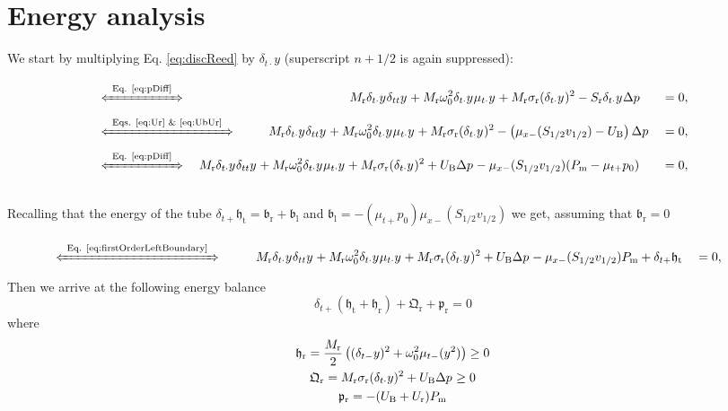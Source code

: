 \section{Energy analysis}
We start by multiplying Eq. \eqref{eq:discReed} by $\delta_{t\cdot}y$ (superscript $n+1/2$ is again suppressed):
\begin{alignat}{2}
    &\xLeftrightarrow{\mystrut\ \text{Eq. \eqref{eq:pDiff}}\ }\qquad\qquad\qquad\qquad\qquad\qquad\quad M_\text{r}\delta_{t\cdot}y^{\nph}\delta_{tt}y^{\nph} + M_\text{r}\omega_0^2\delta_{t\cdot}y^{\nph}\mu_{t\cdot}y^{\nph} + M_\text{r} \sigma_\text{r}(\delta_{t\cdot}y^{\nph})^2 - S_\text{r}\delta_{t\cdot}y^{\nph}\Delta p^{\nph} &&= 0,\nonumber\\[-5pt]
    &\xLeftrightarrow{\mystrut\ \text{Eqs. \eqref{eq:Ur} \& \eqref{eq:UbUr}}\ } \qquad \ \: M_\text{r}\delta_{t\cdot}y^{\nph}\delta_{tt}y^{\nph} + M_\text{r}\omega_0^2\delta_{t\cdot}y^{\nph}\mu_{t\cdot}y^{\nph} + M_\text{r} \sigma_\text{r}(\delta_{t\cdot}y^{\nph})^2 - \left(\mu_{x-}(S_{1/2}v_{1/2})-U_\text{B}\right)\Delta p^{\nph} &&= 0,\nonumber\\[-5pt]
    &\xLeftrightarrow{\mystrut\ \text{Eq. \eqref{eq:pDiff}}\ } \quad M_\text{r}\delta_{t\cdot}y^{\nph}\delta_{tt}y^{\nph} + M_\text{r}\omega_0^2\delta_{t\cdot}y^{\nph}\mu_{t\cdot}y^{\nph} + M_\text{r} \sigma_\text{r}(\delta_{t\cdot}y^{\nph})^2 + U_\text{B}\Delta p^{\nph}-\mu_{x-}(S_{1/2}v_{1/2})(P_\text{m} - \mu_{t+}p_0) &&= 0,\nonumber
\end{alignat}
\vspace{-5pt}\\
Recalling that the energy of the tube $\delta_{t+}\mathfrak{h}_\text{t} = \mathfrak{b}_\text{r} + \mathfrak{b}_\text{l}$ and $\mathfrak{b}_\text{l} = -(\mu_{t+}p_0)\mu_{x-}(S_{1/2}v_{1/2})$ we get, assuming that $\mathfrak{b}_\text{r} = 0$\vspace{-5pt}
\begin{alignat}{2}
    &\xLeftrightarrow{\mystrut\ \text{Eq. \eqref{eq:firstOrderLeftBoundary}}\ }\qquad\ \  M_\text{r}\delta_{t\cdot}y^{\nph}\delta_{tt}y^{\nph} + M_\text{r}\omega_0^2\delta_{t\cdot}y^{\nph}\mu_{t\cdot}y^{\nph} + M_\text{r} \sigma_\text{r}(\delta_{t\cdot}y^{\nph})^2 + U_\text{B}\Delta p^{\nph}-\mu_{x-}(S_{1/2}v_{1/2})P_\text{m} + \delta_{t+}\mathfrak{h}_\text{t} &&= 0,\nonumber
\end{alignat}
Then we arrive at the following energy balance
\begin{equation}
    \delta_{t+}\left(\mathfrak{h}_\text{t}+\mathfrak{h}_\text{r}\right) + \mathfrak{Q}_\text{r} + \mathfrak{p}_\text{r} = 0
\end{equation}
where
\begin{gather}
    \mathfrak{h}_\text{r} = \frac{M_\text{r}}{2}\left((\delta_{t-}y)^2+\omega_0^2\mu_{t-}(y^2)\right) \geq 0\\
    \mathfrak{Q}_\text{r} = M_\text{r}\sigma_\text{r}(\delta_{t\cdot} y)^2 + U_\text{B}\Delta p^{} \geq 0\\
    \mathfrak{p}_\text{r} = -(U_\text{B} + U_\text{r})P_\text{m}
\end{gather}


